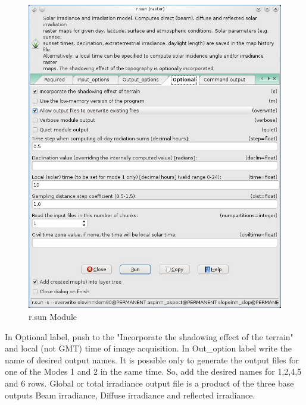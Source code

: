 \begin{figure}[htbp]
   \centering
   \includegraphics[scale=0.4]{gipe024.png}
   \caption{r.sun Module}
   \label{fig:gipe024}
\end{figure}

In Optional label, push to the "Incorporate the shadowing effect of the terrain" and local (not GMT) time  of image acquisition.\newline
In Out\_option label write the name of desired output names. It is possible only to generate the output files for one of the Modes 1 and 2 in the same time.  So, add the desired names for 1,2,4,5 and 6 rows. Global or total irradiance output file is a product of the three base outputs Beam irradiance, Diffuse irradiance and reflected irradiance.\newline

